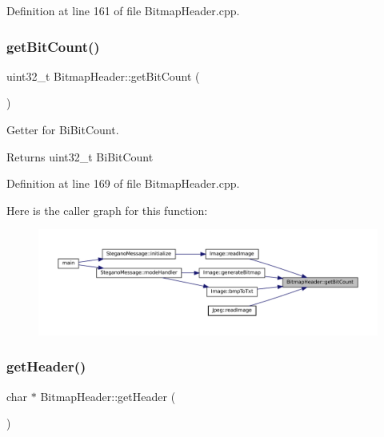 Definition at line 161 of file Bitmap\+Header.\+cpp.

\mbox{\label{classBitmapHeader_a2660782990f1d9547e0aef501f666969}} 
\subsubsection{\texorpdfstring{getBitCount()}{getBitCount()}}
{\footnotesize\ttfamily uint32\+\_\+t Bitmap\+Header\+::get\+Bit\+Count (\begin{DoxyParamCaption}{ }\end{DoxyParamCaption})}



Getter for Bi\+Bit\+Count. 

\begin{DoxyReturn}{Returns}
uint32\+\_\+t Bi\+Bit\+Count 
\end{DoxyReturn}


Definition at line 169 of file Bitmap\+Header.\+cpp.

Here is the caller graph for this function\+:\nopagebreak
\begin{figure}[H]
\begin{center}
\leavevmode
\includegraphics[width=350pt]{classBitmapHeader_a2660782990f1d9547e0aef501f666969_icgraph}
\end{center}
\end{figure}
\mbox{\label{classBitmapHeader_aa29e1acc8a7a588867039d7c0bdcde04}} 
\subsubsection{\texorpdfstring{getHeader()}{getHeader()}}
{\footnotesize\ttfamily char $\ast$ Bitmap\+Header\+::get\+Header (\begin{DoxyParamCaption}{ }\end{DoxyParamCaption})}




